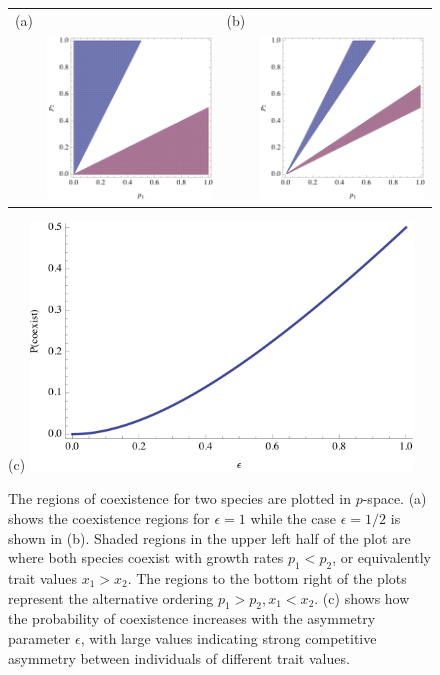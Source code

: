 \begin{figure}[htbp]
\centering
   \begin{tabular}{rrrr}
  (a) & & (b) &  \\ &  \includegraphics[width=2.2in]{Figure1a} & & \includegraphics[width=2.2in]{Figure1b} \end{tabular}
 (c)
 \includegraphics[width=4in]{Figure1c}
   \caption[Coexistence of two species with completely asymmetric competition]{The regions of coexistence for two species are plotted in $p$-space. (a) shows the coexistence regions for $\epsilon=1$ while the case $\epsilon=1/2$ is shown in (b). Shaded regions in the upper left half of the plot are where both species coexist with growth rates $p_1<p_2$, or equivalently trait values $x_1>x_2$. The  regions to the bottom right of the plots represent the alternative ordering $p_1>p_2, x_1<x_2$. (c) shows how the probability of coexistence increases with the asymmetry parameter $\epsilon$, with large values indicating strong competitive asymmetry between individuals of different trait values.}
 \label{fig:2d}
\end{figure}

